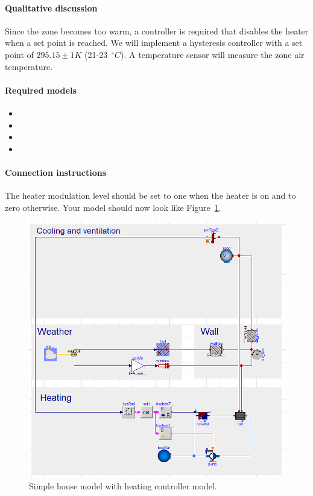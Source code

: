 \documentclass[10pt,a4paper]{article}
\begin{document}
\paragraph{Qualitative discussion}
Since the zone becomes too warm, a controller
is required that disables the
heater when a set point is reached.
We will implement a hysteresis controller with a set point of $295.15 \pm 1 K$ 
(21-23~$^{\circ}C$).
A temperature sensor will measure the zone air temperature.


\paragraph{Required models}
\begin{itemize}
\item {}
\item {}
\item {}
\item {}
\end{itemize}

\paragraph{Connection instructions}
The heater modulation level should be set to one when
the heater is on and to zero otherwise. Your model should now
look like Figure~\ref{fig:heatingControllerModel}.

\begin{figure}[h!]
\centering
\includegraphics[scale=0.4]{heatingControllerModel.png}
\caption{Simple house model with heating controller model.}
\label{fig:heatingControllerModel}
\end{figure} 
\end{document}
